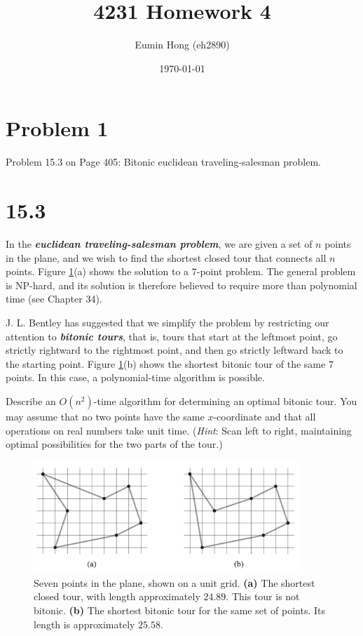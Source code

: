 \documentclass{../../class}
\title{4231 Homework 4}
\author{Eumin Hong (eh2890)}
\date{\today}
\begin{document}
\maketitle



\section*{Problem 1}
\begin{tcolorbox}
    Problem 15.3 on Page 405: Bitonic euclidean traveling-salesman problem.
\end{tcolorbox}
\section*{15.3}
In the \textbf{\textit{euclidean traveling-salesman problem}}, we are given a set of $n$ points in the plane, and we wish to find the shortest closed tour that connects all $n$ points. Figure \ref{fig:15-11.png}(a) shows the solution to a $7$-point problem. The general problem is NP-hard, and its solution is therefore believed to require more than polynomial time (see Chapter 34).

J. L. Bentley has suggested that we simplify the problem by restricting our attention to \textbf{\textit{bitonic tours}}, that is, tours that start at the leftmost point, go strictly rightward to the rightmost point, and then go strictly leftward back to the starting point. Figure \ref{fig:15-11.png}(b) shows the shortest bitonic tour of the same 7 points. In this case, a polynomial-time algorithm is possible.

Describe an $O(n^2)$-time algorithm for determining an optimal bitonic tour. You may assume that no two points have the same $x$-coordinate and that all operations on real numbers take unit time. (\textit{Hint}: Scan left to right, maintaining optimal possibilities for the two parts of the tour.)

\begin{figure}[H]
    \centering
    \includegraphics[width = 10cm]{img/15-11.png}
    \caption{Seven points in the plane, shown on a unit grid. \textbf{(a)} The shortest closed tour, with length approximately $24.89$. This tour is not bitonic. \textbf{(b)} The shortest bitonic tour for the same set of points. Its length is approximately $25.58$.}
    \label{fig:15-11.png}
\end{figure}
\end{document}
